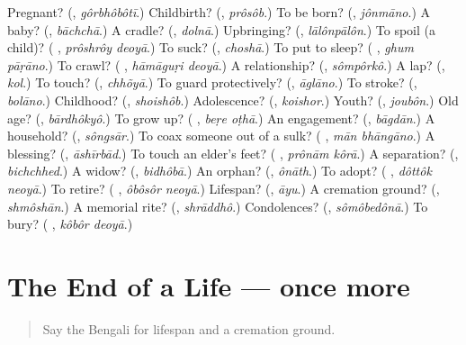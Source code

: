 \begin{tcolorbox}[breakable,colback=teal!4,colframe=teal!35!black,title={Before you move on}]
Pregnant? (\textbf{}, \emph{gôrbhôbôtī}.) Childbirth? (\textbf{}, \emph{prôsôb}.) To be born? (\textbf{}, \emph{jônmāno}.) A baby? (\textbf{}, \emph{bāchchā}.) A cradle? (\textbf{}, \emph{dolnā}.) Upbringing? (\textbf{}, \emph{lālônpālôn}.) To spoil (a child)? (\textbf{ }, \emph{prôshrôy deoyā}.) To suck? (\textbf{}, \emph{choshā}.) To put to sleep? (\textbf{ }, \emph{ghum pāṛāno}.) To crawl? (\textbf{ }, \emph{hāmāguṛi deoyā}.) A relationship? (\textbf{}, \emph{sômpôrkô}.) A lap? (\textbf{}, \emph{kol}.) To touch? (\textbf{}, \emph{chhõyā}.) To guard protectively? (\textbf{}, \emph{āglāno}.) To stroke? (\textbf{}, \emph{bolāno}.) Childhood? (\textbf{}, \emph{shoishôb}.) Adolescence? (\textbf{}, \emph{koishor}.) Youth? (\textbf{}, \emph{joubôn}.) Old age? (\textbf{}, \emph{bārdhôkyô}.) To grow up? (\textbf{ }, \emph{beṛe oṭhā}.) An engagement? (\textbf{}, \emph{bāgdān}.) A household? (\textbf{}, \emph{sôngsār}.) To coax someone out of a sulk? (\textbf{ }, \emph{mān bhāngāno}.) A blessing? (\textbf{}, \emph{āshīrbād}.) To touch an elder's feet? (\textbf{ }, \emph{prônām kôrā}.) A separation? (\textbf{}, \emph{bichchhed}.) A widow? (\textbf{}, \emph{bidhôbā}.) An orphan? (\textbf{}, \emph{ônāth}.) To adopt? (\textbf{ }, \emph{dôttôk neoyā}.) To retire? (\textbf{ }, \emph{ôbôsôr neoyā}.) Lifespan? (\textbf{}, \emph{āyu}.) A cremation ground? (\textbf{}, \emph{shmôshān}.) A memorial rite? (\textbf{}, \emph{shrāddhô}.) Condolences? (\textbf{}, \emph{sômôbedônā}.) To bury? (\textbf{ }, \emph{kôbôr deoyā}.)
\end{tcolorbox}
\section[(dialogue)]{The End of a Life — once more}

\label{lesson:BN-R491-review-final-491}



\begin{quote}
Say the Bengali for lifespan and a cremation ground.
\end{quote}

